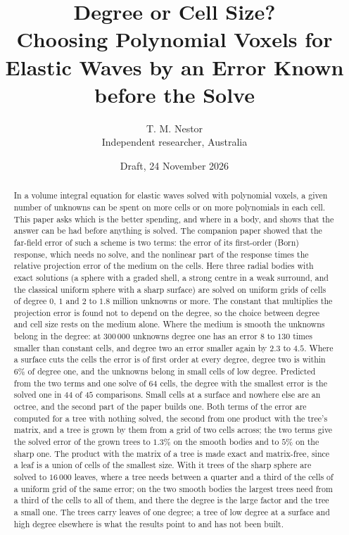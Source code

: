 \documentclass[11pt,a4paper]{article}
\title{\bfseries Degree or Cell Size?\\[4pt]
\large Choosing Polynomial Voxels for Elastic Waves by an Error Known before the Solve}
\author{T. M. Nestor\\[2pt]\small Independent researcher, Australia}
\date{Draft, 24 November 2026}
\begin{document}
\maketitle

\begin{abstract}
\noindent
In a volume integral equation for elastic waves solved with polynomial voxels, a given number of
unknowns can be spent on more cells or on more polynomials in each cell. This paper asks which is the
better spending, and where in a body, and shows that the answer can be had before anything is solved.
The companion paper \citep{NestorError2026} showed that the far-field error of such a scheme is two
terms: the error of its first-order (Born) response, which needs no solve, and the nonlinear part of the
response times the relative projection error of the medium on the cells. Here three radial bodies with
exact solutions (a sphere with a graded shell, a strong centre in a weak surround, and the classical
uniform sphere with a sharp surface) are solved on uniform grids of cells of degree $0$, $1$ and $2$ to
$1.8$ million unknowns or more. The constant that multiplies the projection error is found not to depend on the
degree, so the choice between degree and cell size rests on the medium alone. Where the medium is
smooth the unknowns belong in the degree: at $300\,000$ unknowns degree one has an error $8$ to $130$
times smaller than constant cells, and degree two an error smaller again by $2.3$ to $4.5$. Where a
surface cuts the cells the error is of first order at every degree, degree two is within $6\%$ of
degree one, and the unknowns belong in small cells of low degree. Predicted from the two terms and one
solve of $64$ cells, the degree with the smallest error is the solved one in $44$ of $45$ comparisons.
Small cells at a surface and nowhere else are an octree, and the second part of the paper builds one.
Both terms of the error are computed for a tree with nothing solved, the second from one product with
the tree's matrix, and a tree is grown by them from a grid of two cells across; the two terms give the
solved error of the grown trees to $1.3\%$ on the smooth bodies and to $5\%$ on the sharp one. The
product with the matrix of a tree is made exact and matrix-free, since a leaf is a union of cells of the
smallest size. With it trees of the sharp sphere are solved to $16\,000$ leaves, where a tree needs
between a quarter and a third of the cells of a uniform grid of the same error; on the two smooth bodies
the largest trees need from a third of the cells to all of them, and there the degree is the large
factor and the tree a small one. The trees carry leaves of one degree; a tree of low degree at a surface
and high degree elsewhere is what the results point to and has not been built.
\end{abstract}
\end{document}
